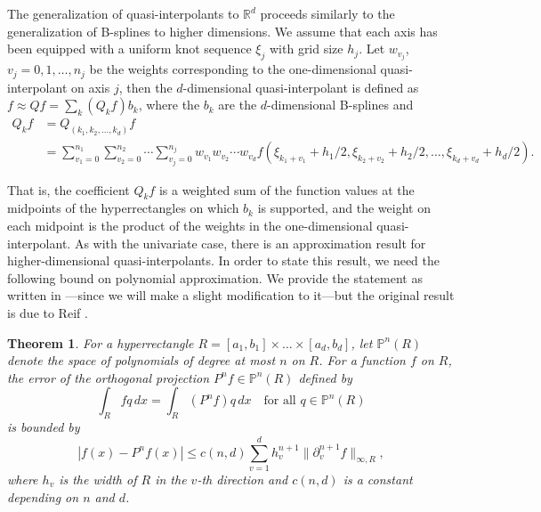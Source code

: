 \documentclass[10pt]{article}
\newtheorem{theorem}{Theorem}[section]
\theoremstyle{definition}
\numberwithin{equation}{section}
\numberwithin{figure}{section}
\numberwithin{table}{section}
\begin{document}
The generalization of quasi-interpolants to $\mathbb{R}^d$ proceeds similarly to the generalization of B-splines to higher dimensions. We assume that each axis has been equipped with a uniform knot sequence $\xi_j$ with grid size $h_j$. Let $w_{v_j}$, $v_j=0,1,\dots,n_j$ be the weights corresponding to the one-dimensional quasi-interpolant on axis $j$, then the $d$-dimensional quasi-interpolant is defined as $f\approx Qf=\sum_k(Q_kf)b_k$, where the $b_k$ are the $d$-dimensional B-splines and 
\begin{align*}
Q_kf&=Q_{(k_1,k_2,\dots,k_d)}f\\
&=\sum_{v_1=0}^{n_1}\sum_{v_2=0}^{n_2}\cdots\sum_{v_j=0}^{n_j}w_{v_1}w_{v_2}\cdots w_{v_d}f(\xi_{k_1+v_1}+h_1/2,\xi_{k_2+v_2}+h_2/2,\dots,\xi_{k_d+v_d}+h_d/2).
\end{align*}

That is, the coefficient $Q_kf$ is a weighted sum of the function values at the midpoints of the hyperrectangles on which $b_k$ is supported, and the weight on each midpoint is the product of the weights in the one-dimensional quasi-interpolant. As with the univariate case, there is an approximation result for higher-dimensional quasi-interpolants. In order to state this result, we need the following bound on polynomial approximation. We provide the statement as written in \cite{hollig2013approximation}---since we will make a slight modification to it---but the original result is due to Reif \cite{reif2012polynomial}.
\begin{theorem}
\label{thm:poly_bound}
For a hyperrectangle $R=[a_1,b_1]\times\dots\times[a_d,b_d]$, let $\mathbb{P}^n(R)$ denote the space of polynomials of degree at most $n$ on $R$. For a function $f$ on $R$, the error of the orthogonal projection $P^nf\in\mathbb{P}^n(R)$ defined by
$$\int_Rfq\,dx=\int_R(P^nf)q\,dx\quad\text{for all $q\in\mathbb{P}^n(R)$}$$
is bounded by
$$|f(x)-P^nf(x)|\leq c(n,d)\sum_{v=1}^dh_v^{n+1}\|\partial_v^{n+1}f\|_{\infty,R},$$
where $h_v$ is the width of $R$ in the $v$-th direction and $c(n,d)$ is a constant depending on $n$ and $d$.
\end{theorem}
\end{document}
